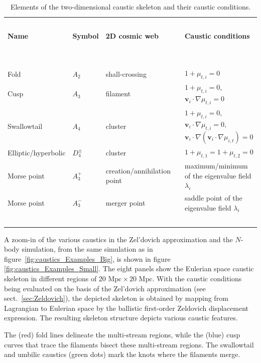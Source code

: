 \documentclass[a4paper, 11pt]{article}
\begin{document}
\begin{table}
\centering
{\scriptsize
\begin{tabular}{ |l | l | l | l | l|}
\hline
  \ &&&& \\
\textbf{Name} & \textbf{Symbol} & \textbf{2D cosmic web} && \textbf{Caustic conditions}\\
  \ &&&& \\
\hline
  \ &&&& \\
Fold & $A_2$ & shall-crossing && $1+ \mu_{t,i} = 0$ \\
Cusp & $A_3$ & filament && $1+ \mu_{t,i} = 0$, $\bm{v}_i \cdot \nabla \mu_{t,i} = 0$\\
Swallowtail &$A_4$ &  cluster && $1+ \mu_{t,i} = 0$, $\bm{v}_i \cdot \nabla \mu_{t,i} = 0,$ $\bm{v}_i \cdot \nabla(\bm{v}_i \cdot \nabla \mu_{i,t}) = 0$\\
Elliptic/hyperbolic & $D_4^{\pm}$ & cluster && $1+ \mu_{t,1} = 1+ \mu_{t,2} = 0$\\
Morse point & $A_3^+$ & creation/annihilation point&& maximum/minimum of the eigenvalue field $\lambda_i$\\
Morse point & $A_3^-$ & merger point && saddle point of the eigenvalue field $\lambda_i$\\
  \ &&&& \\
\hline
\end{tabular}
}
\caption{Elements of the two-dimensional caustic skeleton and their caustic conditions.}
\label{table:caustics}
\end{table}

\bigskip
A zoom-in of the various caustics in the Zel'dovich approximation and the $N$-body simulation, from the same simulation as in figure~\ref{fig:caustics_Examples_Big}, is shown in figure \ref{fig:caustics_Examples_Small}. The eight panels show the Eulerian space caustic skeleton in different regions of $20 \text{ Mpc} \times 20 \text{ Mpc}$. With the caustic conditions being evaluated on the basis of the Zel'dovich approximation (see sect.~\ref{sec:Zeldovich}), the depicted skeleton is obtained by mapping from Lagrangian to Eulerian space by the ballistic first-order Zeldovich displacement expression. The resulting skeleton structure depicts various caustic features. 

The (red) fold lines delineate the multi-stream regions, while the (blue) cusp curves that trace the filaments bisect these multi-stream regions. The swallowtail and umbilic caustics (green dots) mark the knots where the filaments merge.

\end{document}
